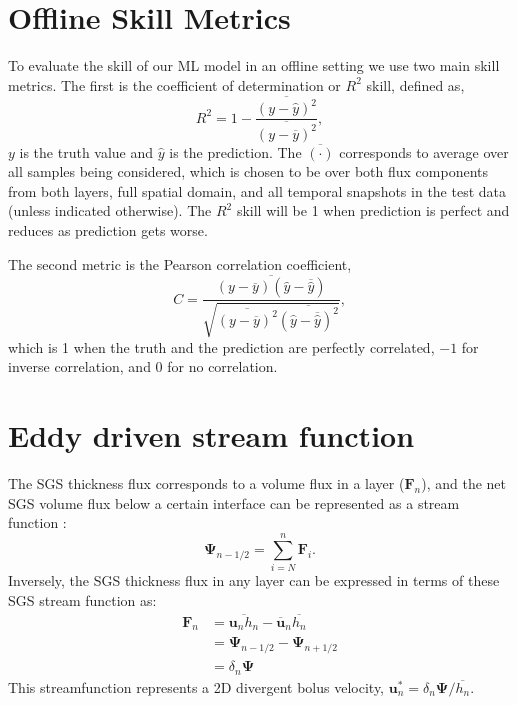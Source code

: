 \documentclass[draft,ms]{agutexSI2019}
\begin{document}
\begin{article}
\onecolumn



\section{Offline Skill Metrics}
\label{app:offline_skill_metrics}

To evaluate the skill of our ML model in an offline setting we use two main skill metrics. The first is the coefficient of determination or $R^2$ skill, defined as, 
\begin{equation}
    R^2 = 1  - \frac{\overline{(y - \hat{y})^2}}{\overline{(y - \overline{y})^2}},
\end{equation}
$y$ is the truth value and $\hat{y}$ is the prediction. The $\overline{(\cdot)}$ corresponds to average over all samples being considered, which is chosen to be over both flux components from both layers, full spatial domain, and all temporal snapshots in the test data (unless indicated otherwise). The $R^2$ skill will be 1 when prediction is perfect and reduces as prediction gets worse. 

The second metric is the Pearson correlation coefficient, 
\begin{equation}
    C = \frac{\overline{(y - \overline{y})(\hat{y} - \overline{\hat{y}})}}{\sqrt{\overline{(y - \overline{y})^2}\overline{(\hat{y} - \overline{\hat{y}})^2}}},
\end{equation}
which is 1 when the truth and the prediction are perfectly correlated, $-1$ for inverse correlation, and 0 for no correlation.



\section{Eddy driven stream function}
\label{app:eddy_streamfn}

The SGS thickness flux corresponds to a volume flux in a layer ($\mathbf{F}_n$), and the net SGS volume flux below a certain interface can be represented as a stream function \cite{mcdougall2001temporal}: 
\begin{equation}
    \mathbf{\Psi}_{n-1/2} = \sum_{i=N}^n \mathbf{F}_i. %
\end{equation}
Inversely, the SGS thickness flux in any layer can be expressed in terms of these SGS stream function as:
\begin{align}
    \mathbf{F}_n & =  \overline{\mathbf{u}_n h_n} -  \overline{\mathbf{u}}_n \overline{h_n} \\
    & = \mathbf{\Psi}_{n-1/2} - \mathbf{\Psi}_{n+1/2} \\
    &  = \delta_n \mathbf{\Psi} 
\end{align}
This streamfunction represents a 2D divergent bolus velocity, $\mathbf{u}_n^* = \delta_n \mathbf{\Psi}/\overline{h_n}$.


\end{article}
\end{document}
